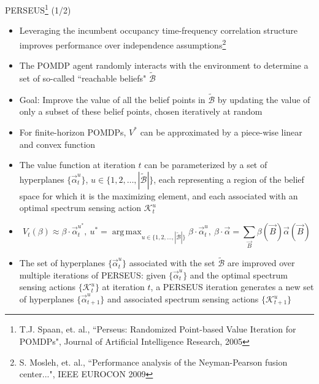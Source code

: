 \documentclass{beamer}
\DeclareMathOperator*{\argmax}{arg\,max}
\begin{document}
\begin{frame}{PERSEUS\footnote{\tiny{T.J. Spaan, et. al., ``Perseus: Randomized Point-based Value Iteration for POMDPs", Journal of Artificial Intelligence Research, 2005}} (1/2)}
    \scriptsize{\begin{itemize}
        \item Leveraging the incumbent occupancy time-frequency correlation structure improves performance over independence assumptions\footnote{\tiny{S. Mosleh, et. al., ``Performance analysis of the Neyman-Pearson fusion center...", IEEE EUROCON 2009}}
        \item The POMDP agent randomly interacts with the environment to determine a set of so-called ``reachable beliefs" $\tilde{\mathcal{B}}$
        \item Goal: Improve the value of all the belief points in $\tilde{\mathcal{B}}$ by updating the value of only a subset of these belief points, chosen iteratively at random
        \item For finite-horizon POMDPs, $V^*$ can be approximated by a piece-wise linear and convex function
        \item The value function at iteration $t$ can be parameterized by a set of hyperplanes $\{\vec{\alpha}_{t}^{u}\}$, $u {\in} \{1,2,\dots,|\tilde{\mathcal{B}}|\}$, each representing a region of the belief space for which it is the maximizing element, and each associated with an optimal spectrum sensing action $\mathcal K_t^{u}$
        \item \[V_{t}(\beta) \approx \beta \cdot \vec{\alpha}_{t}^{u^*},\ u^* = \argmax_{u\in\{1,2,\dots,|\tilde{\mathcal{B}}|\}} \beta \cdot \vec{\alpha}_{t}^{u},\ \beta\cdot\vec{\alpha}{=}\sum_{\vec{B}}\beta(\vec{B})\vec{\alpha}(\vec{B})\]
        \item The set of hyperplanes $\{\vec{\alpha}_{t}^{u}\}$ associated with the set $\tilde{\mathcal{B}}$ are improved over multiple iterations of PERSEUS: given $\{\vec{\alpha}_{t}^{u}\}$ and the optimal spectrum sensing actions $\{\mathcal K_{t}^{u}\}$ at iteration $t$, a PERSEUS iteration generates a new set of hyperplanes $\{\vec{\alpha}_{t+1}^{u}\}$ and associated spectrum sensing actions $\{\mathcal K_{t+1}^{u}\}$
    \end{itemize}}
\end{frame}
\end{document}
